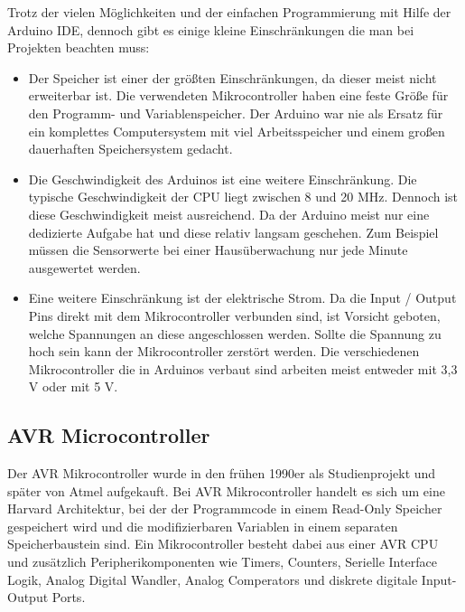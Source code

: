 Trotz der vielen Möglichkeiten und der einfachen Programmierung mit Hilfe der Arduino IDE, dennoch gibt es einige kleine Einschränkungen die man bei Projekten beachten muss:
\begin{itemize}
	\item Der Speicher ist einer der größten Einschränkungen, da dieser meist nicht erweiterbar ist. Die verwendeten Mikrocontroller haben eine feste Größe für den Programm- und Variablenspeicher. Der Arduino war nie als Ersatz für ein komplettes Computersystem mit viel Arbeitsspeicher und einem großen dauerhaften Speichersystem gedacht.
	\item Die Geschwindigkeit des Arduinos ist eine weitere Einschränkung. Die typische Geschwindigkeit der CPU liegt zwischen 8 und 20 MHz. Dennoch ist diese Geschwindigkeit meist ausreichend. Da der Arduino meist nur eine dedizierte Aufgabe hat und diese relativ langsam geschehen. Zum Beispiel müssen die Sensorwerte bei einer Hausüberwachung nur jede Minute  ausgewertet werden. 
	\item Eine weitere Einschränkung ist der elektrische Strom. Da die Input / Output Pins direkt mit dem Mikrocontroller verbunden sind, ist Vorsicht geboten, welche Spannungen an diese angeschlossen werden. Sollte die Spannung zu hoch sein kann der Mikrocontroller zerstört werden. Die verschiedenen Mikrocontroller die in Arduinos verbaut sind arbeiten meist entweder mit 3,3 V oder mit 5 V. 
\end{itemize}
\subsection{AVR Microcontroller}
\label{sec:AvrMikrocontroller}
Der AVR Mikrocontroller wurde in den frühen 1990er als Studienprojekt und später von Atmel aufgekauft. Bei AVR Mikrocontroller handelt es sich um eine Harvard Architektur, bei der der Programmcode in einem Read-Only Speicher gespeichert wird und die modifizierbaren Variablen in einem separaten Speicherbaustein sind. Ein Mikrocontroller besteht dabei aus  einer AVR CPU und zusätzlich Peripherikomponenten wie Timers, Counters, Serielle Interface Logik, Analog Digital Wandler, Analog Comperators und diskrete digitale Input-Output Ports. 
